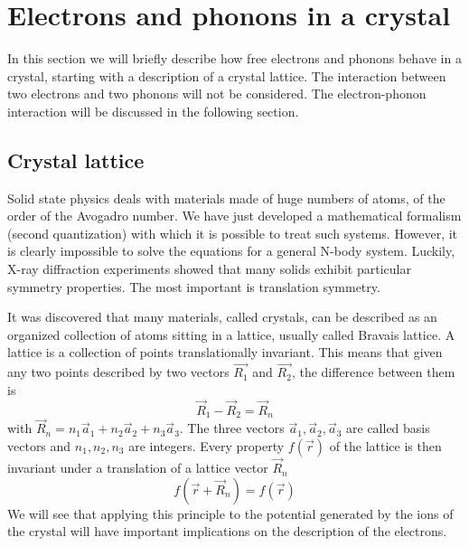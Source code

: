 \section{Electrons and phonons in a crystal}
In this section we will briefly describe how free electrons and phonons behave in a crystal, starting with a description of a crystal lattice. The interaction between two electrons and two phonons will not be considered. The electron-phonon interaction will be discussed in the following section.
\subsection{Crystal lattice}
Solid state physics deals with materials made of huge numbers of atoms, of the order of the Avogadro number. We have just developed a mathematical formalism (second quantization) with which it is possible to treat such systems. However, it is clearly impossible to solve the equations for a general N-body system. Luckily, X-ray diffraction experiments showed that many solids exhibit particular symmetry properties. The most important is translation symmetry.


It was discovered that many materials, called crystals, can be described as an organized collection of atoms sitting in a lattice, usually called Bravais lattice. A lattice is a collection of points translationally invariant. This means that given any two points described by two vectors $\vec{R_1}$ and $\vec{R_2}$, the difference between them is
\begin{equation}
    \vec{R}_1 - \vec{R}_2 = \vec{R}_n
\end{equation}
with $\vec{R}_n = n_1\vec{a}_1 + n_2\vec{a}_2 + n_3\vec{a}_3$. The three vectors $\vec{a}_1, \vec{a}_2, \vec{a}_3$ are called basis vectors and $n_1, n_2, n_3$ are integers. Every property $f(\vec{r})$ of the lattice is then invariant under a translation of a lattice vector $\vec{R}_n$
\begin{equation}
    f(\vec{r}+\vec{R}_n) = f(\vec{r})
\end{equation}
We will see that applying this principle to the potential generated by the ions of the crystal will have important implications on the description of the electrons.

